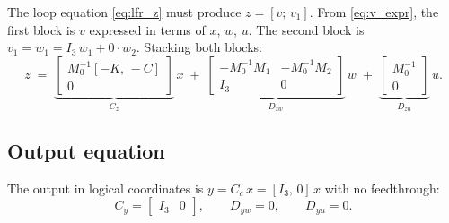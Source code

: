 \documentclass[11pt]{article}
\begin{document}
The loop equation \eqref{eq:lfr_z} must produce $z = [v;\,v_1]$.
From \eqref{eq:v_expr}, the first block is $v$ expressed in terms of $x$, $w$, $u$.
The second block is $v_1 = w_1 = I_3\,w_1 + 0\cdot w_2$.
Stacking both blocks:
\begin{equation}
    z \;=\;
    \underbrace{\begin{bmatrix} M_0^{-1}[-K,\,-C] \\ 0 \end{bmatrix}}_{C_z}\,x
    \;+\;
    \underbrace{\begin{bmatrix} -M_0^{-1}M_1 & -M_0^{-1}M_2 \\ I_3 & 0 \end{bmatrix}}_{D_{zw}}\,w
    \;+\;
    \underbrace{\begin{bmatrix} M_0^{-1} \\ 0 \end{bmatrix}}_{D_{zu}}\,u.
    \label{eq:z_eq}
\end{equation}

\subsection{Output equation}

The output in logical coordinates is $y = C_c\,x = [I_3,\,0]\,x$ with no feedthrough:
\begin{equation}
    C_y = \begin{bmatrix} I_3 & 0 \end{bmatrix}, \qquad D_{yw} = 0, \qquad D_{yu} = 0.
    \label{eq:out_eq}
\end{equation}
\end{document}
